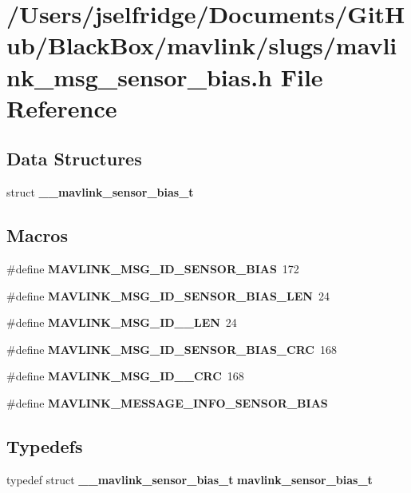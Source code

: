 \section{/\+Users/jselfridge/\+Documents/\+Git\+Hub/\+Black\+Box/mavlink/slugs/mavlink\+\_\+msg\+\_\+sensor\+\_\+bias.h File Reference}
\label{mavlink__msg__sensor__bias_8h}
\subsection*{Data Structures}
\begin{DoxyCompactItemize}
\item 
struct \textbf{ \+\_\+\+\_\+mavlink\+\_\+sensor\+\_\+bias\+\_\+t}
\end{DoxyCompactItemize}
\subsection*{Macros}
\begin{DoxyCompactItemize}
\item 
\#define \textbf{ M\+A\+V\+L\+I\+N\+K\+\_\+\+M\+S\+G\+\_\+\+I\+D\+\_\+\+S\+E\+N\+S\+O\+R\+\_\+\+B\+I\+AS}~172
\item 
\#define \textbf{ M\+A\+V\+L\+I\+N\+K\+\_\+\+M\+S\+G\+\_\+\+I\+D\+\_\+\+S\+E\+N\+S\+O\+R\+\_\+\+B\+I\+A\+S\+\_\+\+L\+EN}~24
\item 
\#define \textbf{ M\+A\+V\+L\+I\+N\+K\+\_\+\+M\+S\+G\+\_\+\+I\+D\+\_\+\_\+\+L\+EN}~24
\item 
\#define \textbf{ M\+A\+V\+L\+I\+N\+K\+\_\+\+M\+S\+G\+\_\+\+I\+D\+\_\+\+S\+E\+N\+S\+O\+R\+\_\+\+B\+I\+A\+S\+\_\+\+C\+RC}~168
\item 
\#define \textbf{ M\+A\+V\+L\+I\+N\+K\+\_\+\+M\+S\+G\+\_\+\+I\+D\+\_\+\_\+\+C\+RC}~168
\item 
\#define \textbf{ M\+A\+V\+L\+I\+N\+K\+\_\+\+M\+E\+S\+S\+A\+G\+E\+\_\+\+I\+N\+F\+O\+\_\+\+S\+E\+N\+S\+O\+R\+\_\+\+B\+I\+AS}
\end{DoxyCompactItemize}
\subsection*{Typedefs}
\begin{DoxyCompactItemize}
\item 
typedef struct \textbf{ \+\_\+\+\_\+mavlink\+\_\+sensor\+\_\+bias\+\_\+t} \textbf{ mavlink\+\_\+sensor\+\_\+bias\+\_\+t}
\end{DoxyCompactItemize}


